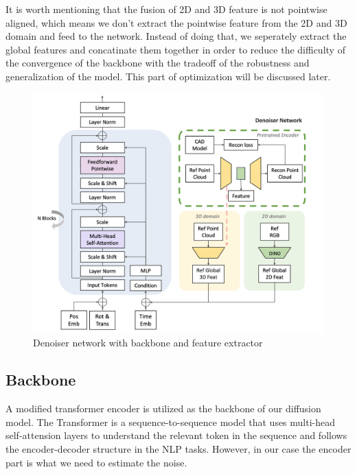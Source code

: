 \documentclass[12pt,DIV14,BCOR12mm,a4paper,footinclude=false,headinclude,parskip=half-,twoside,openright,cleardoublepage=empty,toc=index,bibliography=totoc,listof=totoc]{scrreprt}
\numberwithin{equation}{chapter}
\begin{document}
It is worth mentioning that the fusion of 2D and 3D feature is not pointwise aligned, which means we don't extract the pointwise feature from the 2D and 3D domain and feed to the network. Instead of doing that, we seperately extract the global features and concatinate them together in order to reduce the difficulty of the convergence of the backbone with the tradeoff of the robustness and generalization of the model. This part of optimization will be discussed later.
\begin{figure}[h]
	\centering
	\includegraphics[scale=.30]{img/denoiser.png}
	\caption{Denoiser network with backbone and feature extractor}
	\label{img:denoiser}
\end{figure}

\subsection{Backbone}
A modified transformer encoder is utilized as the backbone of our diffusion model. The Transformer\cite{vaswani2023attention} is a sequence-to-sequence model that uses multi-head self-attension layers to understand the relevant token in the sequence and follows the encoder-decoder structure in the NLP tasks. However, in our case the encoder part is what we need to estimate the noise.
\end{document}
